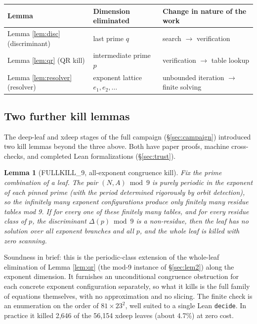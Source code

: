 \documentclass[11pt]{article}
\newtheorem{lemma}{Lemma}
\theoremstyle{remark}
\begin{document}
\begin{center}
\begin{tabular}{lll}
\toprule Lemma & Dimension eliminated & Change in nature of the work \\
\midrule Lemma \ref{lem:disc} (discriminant) & last prime $q$ & search $\to$ verification \\
Lemma \ref{lem:qr} (QR kill) & intermediate prime $p$ & verification $\to$ table lookup \\
Lemma \ref{lem:resolver} (resolver) & exponent lattice $e_1, e_2, \dots$ & unbounded iteration $\to$ finite solving \\
\bottomrule
\end{tabular}
\end{center}

\subsection{Two further kill lemmas}\label{sec:newkills}

The deep-leaf and xdeep stages of the full campaign (\S\ref{sec:campaign}) introduced two kill lemmas beyond the three above. Both have paper proofs, machine cross-checks, and completed Lean formalizations (\S\ref{sec:trust}).

\begin{lemma}[FULLKILL\_9, all-exponent congruence kill]\label{lem:fullkill} Fix the prime combination of a leaf. The pair $(N, A) \bmod 9$ is purely periodic in the exponent of each pinned prime (with the period determined rigorously by orbit detection), so the infinitely many exponent configurations produce only finitely many residue tables mod 9. If for every one of these finitely many tables, and for every residue class of $p$, the discriminant $\Delta(p) \bmod 9$ is a non-residue, then the leaf has no solution over all exponent branches and all $p$, and the whole leaf is killed with zero scanning.
\end{lemma}

Soundness in brief: this is the periodic-class extension of the whole-leaf elimination of Lemma \ref{lem:qr} (the mod-9 instance of \S\ref{sec:lem2}) along the exponent dimension. It furnishes an unconditional congruence obstruction for each concrete exponent configuration separately, so what it kills is the full family of equations themselves, with no approximation and no slicing. The finite check is an enumeration on the order of $81 \times 23^2$, well suited to a single Lean \texttt{decide}. In practice it killed 2,646 of the 56,154 xdeep leaves (about 4.7\%) at zero cost.
\end{document}
